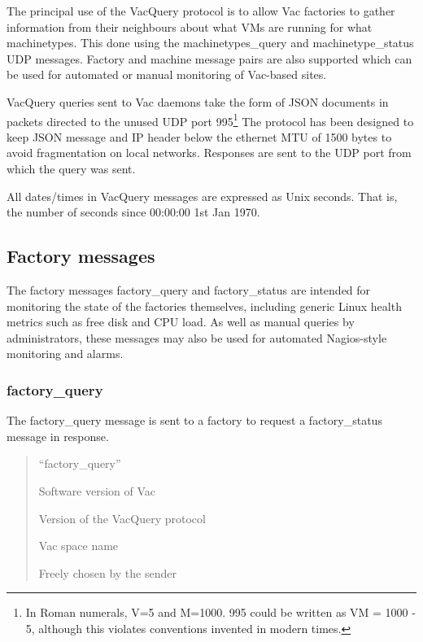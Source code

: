 \documentclass[12pt,a4paper]{article}
\begin{document}
The principal use of the VacQuery protocol is to allow Vac factories to
gather information from their neighbours about what VMs are running for
what machinetypes. This done using the machinetypes\_query and
machinetype\_status UDP messages. Factory and machine message pairs
are also supported which can be used for automated or manual 
monitoring of Vac-based sites.

VacQuery queries sent to Vac daemons take the form of JSON documents
in packets directed to the unused UDP port 
995\footnote{In Roman numerals, V=5 and M=1000. 995 could be written
as VM = 1000 - 5, although this violates conventions invented in 
modern times.} The protocol has been designed to keep JSON message and
IP header below the ethernet MTU of 1500 bytes to avoid fragmentation
on local networks. Responses are sent to the UDP port from which the
query was sent.

All dates/times in VacQuery messages are expressed as Unix seconds. That
is, the number of seconds since 00:00:00 1st Jan 1970.

\subsection{Factory messages}
\label{sec:factorymessages}

The factory messages factory\_query and factory\_status are intended
for monitoring the state of the factories themselves, including
generic Linux health metrics such as free disk and CPU load. As well
as manual queries by administrators, these messages may also be
used for automated Nagios-style monitoring and alarms.

\subsubsection{factory\_query}
\label{sec:factoryquery}

The factory\_query message is sent to a factory to request a 
factory\_status message in response.

\begin{quote}
\begin{description}
\setlength{\parskip}{0pt}
\item[message\_type] ``factory\_query''
\item[vac\_version] Software version of Vac
\item[vacquery\_version] Version of the VacQuery protocol
\item[space] Vac space name
\item[cookie] Freely chosen by the sender
\end{description}
\end{quote}
\end{document}
